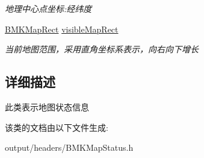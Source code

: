 \begin{DoxyCompactItemize}
\begin{DoxyCompactList}\small\item\em 地理中心点坐标\+:经纬度 \end{DoxyCompactList}\item 
\hypertarget{interface_b_m_k_map_status_aa9c7b70cac3f3dfb7b3b3dfd669850fb}{}\hyperlink{struct_b_m_k_map_rect}{B\+M\+K\+Map\+Rect} \hyperlink{interface_b_m_k_map_status_aa9c7b70cac3f3dfb7b3b3dfd669850fb}{visible\+Map\+Rect}\label{interface_b_m_k_map_status_aa9c7b70cac3f3dfb7b3b3dfd669850fb}

\begin{DoxyCompactList}\small\item\em 当前地图范围，采用直角坐标系表示，向右向下增长 \end{DoxyCompactList}\end{DoxyCompactItemize}


\subsection{详细描述}
此类表示地图状态信息 

该类的文档由以下文件生成\+:\begin{DoxyCompactItemize}
\item 
output/headers/B\+M\+K\+Map\+Status.\+h\end{DoxyCompactItemize}
